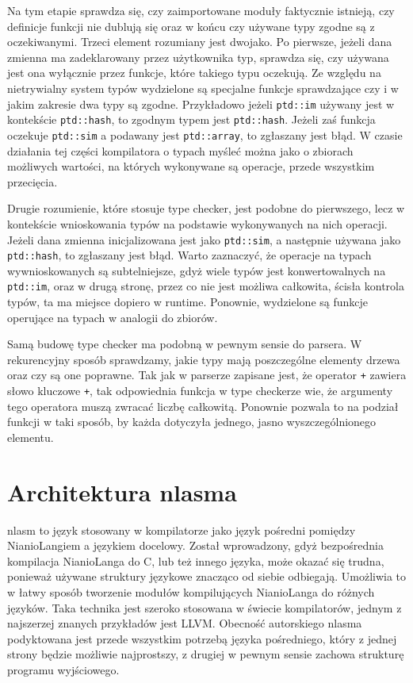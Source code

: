\documentclass[licencjacka]{pracamgr}
\begin{document}
Na tym etapie sprawdza się, czy zaimportowane moduły faktycznie istnieją, czy definicje funkcji nie dublują się oraz w końcu czy używane typy zgodne
są z oczekiwanymi. Trzeci element rozumiany jest dwojako. Po pierwsze, jeżeli dana zmienna ma zadeklarowany przez użytkownika typ, sprawdza się, czy
używana jest ona wyłącznie przez funkcje, które takiego typu oczekują.  Ze względu na nietrywialny system typów wydzielone są specjalne funkcje
sprawdzające czy i w jakim zakresie dwa typy są zgodne. Przykładowo jeżeli \texttt{ptd::im} używany jest w kontekście \texttt{ptd::hash}, to zgodnym typem jest
\texttt{ptd::hash}. Jeżeli zaś funkcja oczekuje \texttt{ptd::sim} a podawany jest \texttt{ptd::array}, to zgłaszany jest błąd. W czasie działania tej części kompilatora o typach myśleć można
jako o zbiorach możliwych wartości, na których wykonywane są operacje, przede wszystkim przecięcia.

Drugie rozumienie, które stosuje type checker, jest podobne do pierwszego, lecz w kontekście wnioskowania typów na podstawie wykonywanych na nich
operacji. Jeżeli dana zmienna inicjalizowana jest jako \texttt{ptd::sim}, a następnie używana jako \texttt{ptd::hash}, to zgłaszany jest błąd. Warto zaznaczyć,
że operacje na typach wywnioskowanych są subtelniejsze, gdyż wiele typów jest konwertowalnych na \texttt{ptd::im}, oraz w drugą stronę, przez co nie jest
możliwa całkowita, ścisła kontrola typów, ta ma miejsce dopiero w runtime. Ponownie, wydzielone są funkcje operujące na typach w analogii do zbiorów.

Samą budowę type checker ma podobną w pewnym sensie do parsera. W rekurencyjny sposób sprawdzamy, jakie typy mają poszczególne elementy drzewa oraz
czy są one poprawne. Tak jak w parserze zapisane jest, że operator \texttt{+} zawiera słowo kluczowe \texttt{+}, tak odpowiednia funkcja w type
checkerze wie, że argumenty tego operatora muszą zwracać liczbę całkowitą. Ponownie pozwala to na podział funkcji w taki sposób, by każda
dotyczyła jednego, jasno wyszczególnionego elementu.
\section{Architektura nlasma}
nlasm to język stosowany w kompilatorze jako język pośredni pomiędzy NianioLangiem a językiem docelowy.
Został wprowadzony, gdyż bezpośrednia kompilacja NianioLanga do C, lub
też innego języka, może okazać się trudna, ponieważ używane struktury językowe znacząco od siebie odbiegają. Umożliwia to w łatwy sposób tworzenie
modułów kompilujących NianioLanga do różnych języków. Taka technika jest szeroko stosowana w świecie kompilatorów, jednym z najszerzej znanych
przykładów jest LLVM. Obecność autorskiego nlasma podyktowana jest przede wszystkim potrzebą języka pośredniego, który z jednej strony będzie możliwie
najprostszy, z drugiej w pewnym sensie zachowa strukturę programu wyjściowego.
\end{document}
